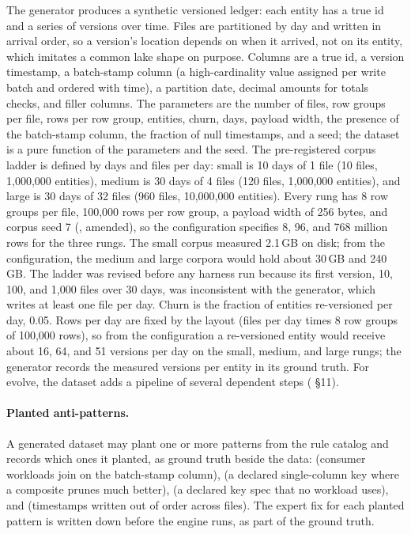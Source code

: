 The generator produces a synthetic versioned ledger: each entity has a true id
and a series of versions over time. Files are partitioned by day and written in
arrival order, so a version's location depends on when it arrived, not on its
entity, which imitates a common lake shape on purpose. Columns are a true id, a
version timestamp, a batch-stamp column (a high-cardinality value assigned per
write batch and ordered with time), a partition date, decimal amounts for totals
checks, and filler columns. The parameters are the number of files, row groups
per file, rows per row group, entities, churn, days, payload width, the
presence of the batch-stamp column, the fraction of null timestamps, and a
seed; the dataset is a pure function of the parameters and the seed. The
pre-registered corpus ladder is defined by days and files per day: small is 10
days of 1 file (10 files, 1,000,000 entities), medium is 30 days of 4 files
(120 files, 1,000,000 entities), and large is 30 days of 32 files (960 files,
10,000,000 entities). Every rung has 8 row groups per file, 100,000 rows per
row group, a payload width of 256 bytes, and corpus seed 7
(, amended), so the configuration specifies 8, 96, and 768
million rows for the three rungs. The small corpus measured 2.1\,GB on disk;
from the configuration, the medium and large corpora would hold about 30\,GB
and 240\,GB. The ladder was revised before any harness run because its first
version, 10, 100, and 1,000 files over 30 days, was inconsistent with the
generator, which writes at least one file per day. Churn is the fraction of
entities re-versioned per day, 0.05. Rows per day are fixed by the layout
(files per day times 8 row groups of 100,000 rows), so from the configuration a
re-versioned entity would receive about 16, 64, and 51 versions per day on the
small, medium, and large rungs; the generator records the measured versions per
entity in its ground truth.
For evolve, the dataset adds a pipeline of several dependent steps
( \S11).

\paragraph{Planted anti-patterns.} A generated dataset may plant one or more
patterns from the rule catalog and records which ones it planted, as ground
truth beside the data:  (consumer workloads join on
the batch-stamp column),  (a
declared single-column key where a composite prunes much better),
 (a declared key spec that no workload
uses), and  (timestamps written out of order
across files).
The expert fix for each planted pattern is written down before the engine runs,
as part of the ground truth.

